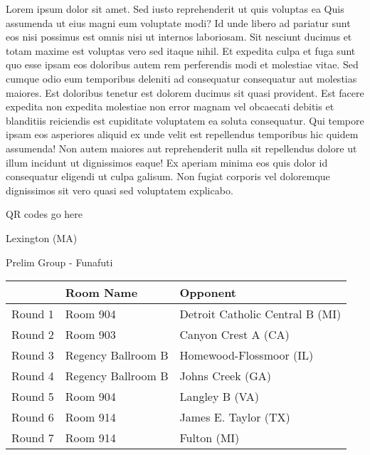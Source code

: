\documentclass{article}%
\begin{document}
\vspace*{8pt}%
\linebreak%
\newline%
\newline%
Lorem ipsum dolor sit amet. Sed iusto reprehenderit ut quis voluptas ea Quis assumenda ut eius magni eum voluptate modi? Id unde libero ad pariatur sunt eos nisi possimus est omnis nisi ut internos laboriosam. Sit nesciunt ducimus et totam maxime est voluptas vero sed itaque nihil. Et expedita culpa et fuga sunt quo esse ipsam eos doloribus autem rem perferendis modi et molestiae vitae.\newline%
\newline%
Sed cumque odio eum temporibus deleniti ad consequatur consequatur aut molestias maiores. Est doloribus tenetur est dolorem ducimus sit quasi provident. Est facere expedita non expedita molestiae non error magnam vel obcaecati debitis et blanditiis reiciendis est cupiditate voluptatem ea soluta consequatur. Qui tempore ipsam eos asperiores aliquid ex unde velit est repellendus temporibus hic quidem assumenda!\newline%
\newline%
Non autem maiores aut reprehenderit nulla sit repellendus dolore ut illum incidunt ut dignissimos eaque! Ex aperiam minima eos quis dolor id consequatur eligendi ut culpa galisum. Non fugiat corporis vel doloremque dignissimos sit vero quasi sed voluptatem explicabo.\newline%
\newline%
%
\vspace*{30pt}%
\begin{center}%
\begin{Huge}%
QR codes go here%
\end{Huge}%
\end{center}%
\newpage%
%
\begin{center}%
\begin{Huge}%
Lexington (MA)%
\end{Huge}%
\vspace*{8pt}%
\linebreak%
\begin{Large}%
Prelim Group {-} Funafuti%
\end{Large}%
\end{center}%
\begin{tabularx}{\textwidth}{|c|Y|Y|}%
\hline%
&Room Name&Opponent\\%
\hline%
Round 1&Room 904&Detroit Catholic Central B (MI)\\%
Round 2&Room 903&Canyon Crest A (CA)\\%
Round 3&Regency Ballroom B&Homewood{-}Flossmoor (IL)\\%
Round 4&Regency Ballroom B&Johns Creek (GA)\\%
Round 5&Room 904&Langley B (VA)\\%
Round 6&Room 914&James E. Taylor (TX)\\%
Round 7&Room 914&Fulton (MI)\\%
\hline%
\end{tabularx}%
\end{document}

